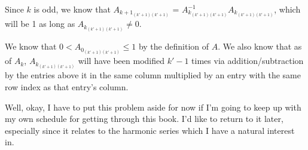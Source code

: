 \documentclass[12pt]{article}
\begin{document}
\begin{enumerate}
    Since $k$ is odd, we know that $A_{k+1_{(k'+1)(k'+1)}}$ =
    $A_{k_{(k'+1)(k'+1)}}^{-1}A_{k_{(k'+1)(k'+1)}}$, which will
    be 1 as long as $A_{k_{(k'+1)(k'+1)}} \neq 0$.

    We know that $0 < A_{0_{(k'+1)(k'+1)}} \leq 1$ by the
    definition of $A$. We also know that as of $A_k$,
    $A_{k_{(k'+1)(k'+1)}}$ will have been modified $k'-1$ times
    via addition/subtraction by the entries above it in the same
    column multiplied by an entry with the same row index as
    that entry's column.

    Well, okay, I have to put this problem aside for now if I'm
    going to keep up with my own schedule for getting through
    this book. I'd like to return to it later, especially since
    it relates to the harmonic series which I have a natural
    interest in.

\end{enumerate}
\end{document}
